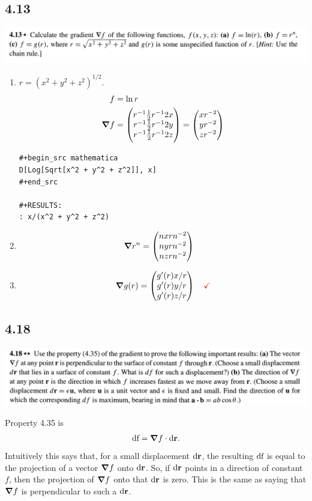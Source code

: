 \subsection{4.13}
\begin{mdframed}
  \includegraphics[width=400pt]{img/physics--classical-mechanics--taylor--q-4-13.png}
\end{mdframed}
\begin{enumerate}[label=(\alph*)]
\item $r = (x^2 + y^2 + z^2)^{1/2}$.
  \begin{align*}
    f &= \ln r \\
    \grad f &= \begin{pmatrix}r^{-1}\frac{1}{2}r^{-1}2x\\r^{-1}\frac{1}{2}r^{-1}2y\\r^{-1}\frac{1}{2}r^{-1}2z\end{pmatrix}
    = \begin{pmatrix}xr^{-2}\\yr^{-2}\\zr^{-2}\end{pmatrix}
  \end{align*}
\begin{verbatim}
#+begin_src mathematica
D[Log[Sqrt[x^2 + y^2 + z^2]], x]
#+end_src

#+RESULTS:
: x/(x^2 + y^2 + z^2)
\end{verbatim}
\item
\begin{align*}
  \grad r^n
  &= \begin{pmatrix}nxrn^{-2}\\nyrn^{-2}\\nzrn^{-2}\end{pmatrix}
\end{align*}
\item
  \begin{align*}
    \grad g(r) = \begin{pmatrix}g'(r)x/r\\g'(r)y/r\\g'(r)z/r\end{pmatrix} ~~~\textcolor{red}{\checkmark}
  \end{align*}
\end{enumerate}

\subsection{4.18}
\begin{mdframed}
  \includegraphics[width=400pt]{img/physics--classical-mechanics--taylor--q-4-18.png}
\end{mdframed}
Property 4.35 is
\begin{align*}
  \df = \grad f \cdot \d\r.
\end{align*}
Intuitively this says that, for a small displacement $\d\r$, the resulting $\operatorname{\text{df}}$ is equal to the
projection of a vector $\grad f$ onto $\d\r$. So, if $\d\r$ points in a direction of constant $f$,
then the projection of $\grad f$ onto that $\d\r$ is zero. This is the same as saying that $\grad f$
is perpendicular to such a $\d\r$.

